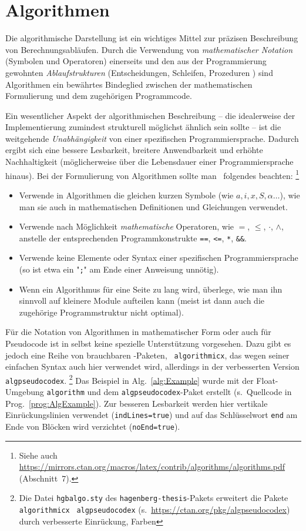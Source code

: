 \section{Algorithmen}

Die algorithmische Darstellung ist ein wichtiges Mittel zur präzisen
Beschreibung von Berechnungsabläufen. Durch die Verwendung von
\emph{mathematischer Notation} (Symbolen und Operatoren) einerseits und den
aus der Programmierung gewohnten \emph{Ablaufstrukturen} (Entscheidungen,
Schleifen, Prozeduren \etc) sind Algorithmen ein bewährtes Bindeglied
zwischen der mathematischen Formulierung und dem zugehörigen Programmcode.

Ein wesentlicher Aspekt der algorithmischen Beschreibung -- die idealerweise
der Implementierung zumindest strukturell möglichst ähnlich sein sollte --
ist die weitgehende \emph{Unabhängigkeit} von einer spezifischen
Programmiersprache. Dadurch ergibt sich eine bessere Lesbarkeit, breitere
Anwendbarkeit und erhöhte Nachhaltigkeit (möglicherweise über die Lebensdauer
einer Programmiersprache hinaus). Bei der Formulierung von Algorithmen sollte
man \ua\ folgendes beachten:%
\footnote{Siehe auch
\url{https://mirrors.ctan.org/macros/latex/contrib/algorithms/algorithms.pdf}
(Abschnitt~7).}
%
\begin{itemize}
	\item
	Verwende in Algorithmen die gleichen kurzen Symbole (wie $a, i, x, S,
	\alpha \ldots$), wie man sie auch in mathematischen Definitionen und
	Gleichungen verwendet.
	\item
	Verwende nach Möglichkeit \emph{mathematische} Operatoren, wie
  $=$, $\leq$, $\cdot$, $\wedge$, \usw
  anstelle der entsprechenden Programmkonstrukte
  \texttt{==}, \texttt{<=}, \texttt{*}, \texttt{\&\&}.
	\item
	Verwende keine Elemente oder Syntax einer spezifischen Programmiersprache
	(so ist etwa ein "\texttt{;}" am Ende einer Anweisung unnötig).
	\item
	Wenn ein Algorithmus für eine Seite zu lang wird, überlege, wie man ihn
	sinnvoll auf kleinere Module aufteilen kann (meist ist dann auch die
	zugehörige Programmstruktur nicht optimal).
\end{itemize}


Für die Notation von Algorithmen in mathematischer Form oder auch für
Pseudo\-code ist in \latex selbst keine spezielle Unterstützung vorgesehen.
Dazu gibt es jedoch eine Reihe von brauchbaren \latex-Paketen, \ua\
\texttt{algorithmicx}, das wegen seiner einfachen Syntax auch hier verwendet
wird, allerdings in der verbesserten Version \texttt{algpseudocodex}.%
\footnote{Die Datei \nolinkurl{hgbalgo.sty} des
\texttt{hagenberg-thesis}-Pakets erweitert die Pakete \texttt{algorithmicx}
\bzw\ \texttt{algpseudocodex} (s.\ \url{https://ctan.org/pkg/algpseudocodex})
durch verbesserte Einrückung, Farben \etc}
%
Das Beispiel in Alg.~\ref{alg:Example} wurde mit der Float-Umgebung
\texttt{algorithm} und dem \texttt{algpseudocodex}-Paket erstellt (s.\
Quellcode in Prog.\ \ref{prog:AlgExample}). Zur besseren Lesbarkeit werden
hier vertikale Einrückungslinien verwendet (\texttt{indLines=true}) und auf
das Schlüsselwort \texttt{end} am Ende von Blöcken wird verzichtet
(\texttt{noEnd=true}).

